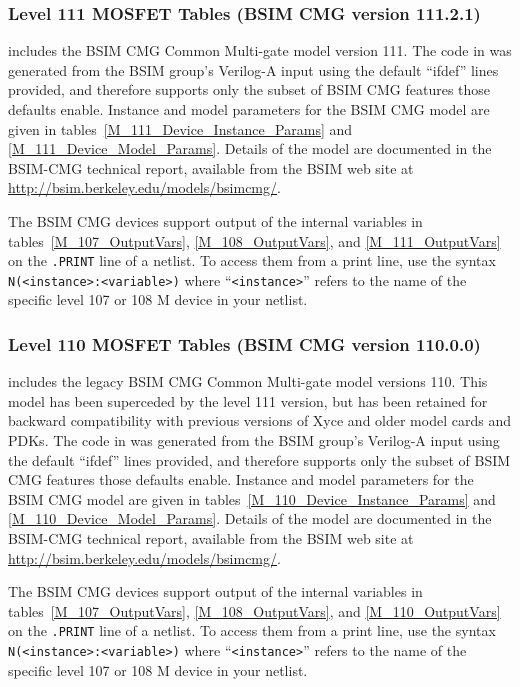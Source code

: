 \subsubsection{Level 111 MOSFET Tables (BSIM CMG version 111.2.1)}
\Xyce{} includes the BSIM CMG Common Multi-gate model version 111.
The code in \Xyce{} was generated from the BSIM group's Verilog-A
input using the default ``ifdef'' lines provided, and therefore
supports only the subset of BSIM CMG features those defaults enable.
Instance and model parameters for the BSIM CMG model are given in
tables~\ref{M_111_Device_Instance_Params} and
\ref{M_111_Device_Model_Params}.  Details of the model are documented
in the BSIM-CMG technical report\cite{BSIMCMG:Manual}, available from
the BSIM web site at
\url{http://bsim.berkeley.edu/models/bsimcmg/}.

The BSIM CMG devices support output of the internal variables in
tables~\ref{M_107_OutputVars}, \ref{M_108_OutputVars}, and  \ref{M_111_OutputVars} on the \texttt{.PRINT} line of a netlist.
To access them from a print line, use the syntax
\texttt{N(<instance>:<variable>)} where ``\texttt{<instance>}'' refers to the
name of the specific level 107 or 108 M device in your netlist.






\subsubsection{Level 110 MOSFET Tables (BSIM CMG version 110.0.0)}

\Xyce{} includes the legacy BSIM CMG Common Multi-gate model versions 110. 
This model has been superceded by the level 111 version, but has been retained for 
backward compatibility with previous versions of Xyce and older model cards and PDKs.
The code in \Xyce{} was generated from the BSIM group's Verilog-A
input using the default ``ifdef'' lines provided, and therefore
supports only the subset of BSIM CMG features those defaults enable.
Instance and model parameters for the BSIM CMG model are given in
tables~\ref{M_110_Device_Instance_Params} and
\ref{M_110_Device_Model_Params}.  Details of the model are documented
in the BSIM-CMG technical report\cite{BSIMCMG:Manual}, available from
the BSIM web site at
\url{http://bsim.berkeley.edu/models/bsimcmg/}.

The BSIM CMG devices support output of the internal variables in
tables~\ref{M_107_OutputVars}, \ref{M_108_OutputVars}, and  \ref{M_110_OutputVars} on the \texttt{.PRINT} line of a netlist.
To access them from a print line, use the syntax
\texttt{N(<instance>:<variable>)} where ``\texttt{<instance>}'' refers to the
name of the specific level 107 or 108 M device in your netlist.

